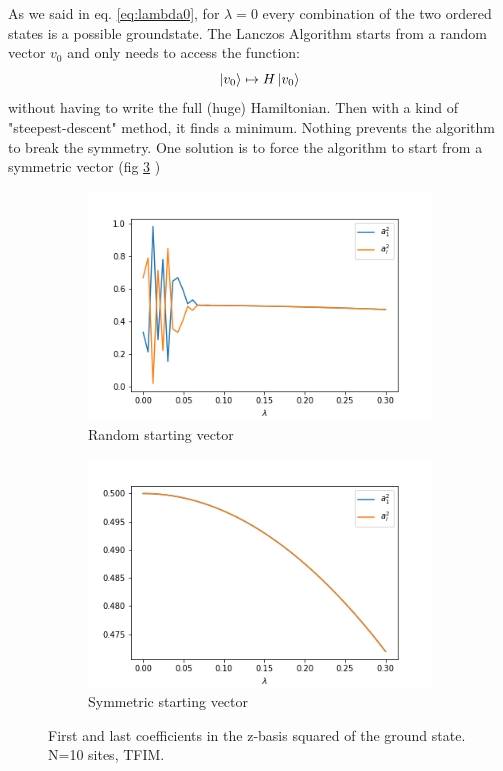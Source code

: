 \documentclass[12pt,a4paper]{article}
\begin{document}
As we said in eq. \ref{eq:lambda0}, for $\lambda=0$ every combination of the two ordered states is a possible groundstate. The Lanczos Algorithm \cite{Lanczos:1950} starts from a random vector $v_0$ and only needs to access the function:
\begin{equation}
	\ket{v_0} \mapsto H \ket{v_0}
\end{equation}
without having to write the full (huge) Hamiltonian.
Then with a kind of "steepest-descent" method, it finds a minimum. Nothing prevents the algorithm to break the symmetry. One solution is to force the algorithm to start from a symmetric vector (fig \ref{fig:correctdiag} )

\begin{figure}[h!]
	\begin{subfigure}{0.5\textwidth}	
	\includegraphics[width=\linewidth]{randomdiag}
	\caption{Random starting vector}
	\label{fig:randomdiag}
	\end{subfigure}
	\begin{subfigure}{0.5\textwidth}
	\includegraphics[width=\linewidth]{correctdiag}
	\caption{Symmetric starting vector}
	\label{fig:correctdiag}
	\end{subfigure}
\caption{First and last coefficients in the z-basis squared of the ground state. N=10 sites,  TFIM.}
\end{figure}
\end{document}
